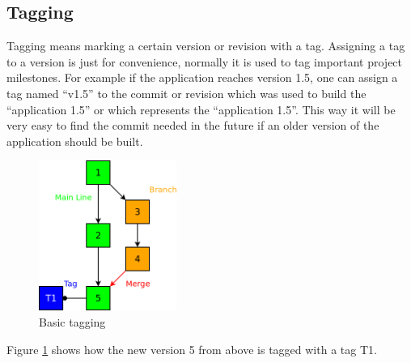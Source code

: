 \subsection{Tagging}

Tagging means marking a certain version or revision with a tag. 
Assigning a tag to a version is just for convenience, normally it is used to tag important project milestones. 
For example if the application reaches version 1.5, one can assign a tag named “v1.5” 
to the commit or revision which was used to build the “application 1.5” or which represents the “application 1.5”. 
This way it will be very easy to find the commit needed in the future if an older version of the application should be built.

\begin{figure}[ht]
  \centering
  \includegraphics[width=0.4\textwidth]{img/Gen_Tag}
  \caption{Basic tagging}
  \label{fig:gen_tag}
\end{figure}

Figure \ref{fig:gen_tag} shows how the new version 5 from above is tagged with a tag T1.
